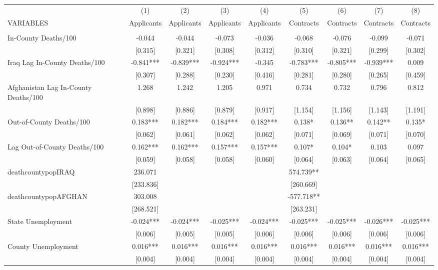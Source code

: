 \documentclass[]{article}
\begin{document}
\begin{tabular}{lcccccccc} \hline
 & (1) & (2) & (3) & (4) & (5) & (6) & (7) & (8) \\
VARIABLES & Applicants & Applicants & Applicants & Applicants & Contracts & Contracts & Contracts & Contracts \\ \hline
 &  &  &  &  &  &  &  &  \\
In-County Deaths/100 & -0.044 & -0.044 & -0.073 & -0.036 & -0.068 & -0.076 & -0.099 & -0.071 \\
 & [0.315] & [0.321] & [0.308] & [0.312] & [0.310] & [0.321] & [0.299] & [0.302] \\
Iraq Lag In-County Deaths/100 & -0.841*** & -0.839*** & -0.924*** & -0.345 & -0.783*** & -0.805*** & -0.939*** & 0.009 \\
 & [0.307] & [0.288] & [0.230] & [0.416] & [0.281] & [0.280] & [0.265] & [0.459] \\
Afghanistan Lag In-County Deaths/100 & 1.268 & 1.242 & 1.205 & 0.971 & 0.734 & 0.732 & 0.796 & 0.812 \\
 & [0.898] & [0.886] & [0.879] & [0.917] & [1.154] & [1.156] & [1.143] & [1.191] \\
Out-of-County Deaths/100 & 0.183*** & 0.182*** & 0.184*** & 0.182*** & 0.138* & 0.136** & 0.142** & 0.135* \\
 & [0.062] & [0.061] & [0.062] & [0.062] & [0.071] & [0.069] & [0.071] & [0.070] \\
Lag Out-of-County Deaths/100 & 0.162*** & 0.162*** & 0.157*** & 0.157*** & 0.107* & 0.104* & 0.103 & 0.097 \\
 & [0.059] & [0.058] & [0.058] & [0.060] & [0.064] & [0.063] & [0.064] & [0.065] \\
deathcountypopIRAQ & 236.071 &  &  &  & 574.739** &  &  &  \\
 & [233.836] &  &  &  & [260.669] &  &  &  \\
deathcountypopAFGHAN & 303.008 &  &  &  & -577.718** &  &  &  \\
 & [268.521] &  &  &  & [263.231] &  &  &  \\
State Unemployment & -0.024*** & -0.024*** & -0.025*** & -0.024*** & -0.025*** & -0.025*** & -0.026*** & -0.025*** \\
 & [0.006] & [0.005] & [0.005] & [0.006] & [0.006] & [0.006] & [0.006] & [0.006] \\
County Unemployment & 0.016*** & 0.016*** & 0.016*** & 0.016*** & 0.016*** & 0.016*** & 0.016*** & 0.016*** \\
 & [0.004] & [0.004] & [0.004] & [0.004] & [0.004] & [0.004] & [0.004] & [0.004] \\

\end{tabular}
\end{document}

